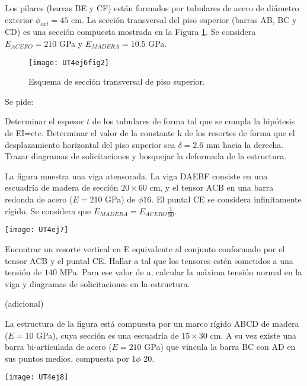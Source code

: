 Los pilares (barras BE y CF) están formados por tubulares de acero de diámetro exterior $\phi_{ext} = 45$ cm. %
%
La sección transversal del piso superior (barras AB, BC y CD) es una sección compuesta mostrada en la Figura \ref{fig62}. %
%
Se considera $E_{ACERO} = 210$ GPa y $E_{MADERA} = 10.5$ GPa.

\begin{figure}[htb]
	\centering
	\texttt{[image: UT4ej6fig2]}
	\caption{Esquema de sección transversal de piso superior.}
	\label{fig62}
\end{figure}
%

Se pide:

\parte Determinar el espesor $t$ de los tubulares de forma tal que se cumpla la hipótesis de EI=cte.
\parte Determinar el valor de la constante k de los resortes de forma que el desplazamiento horizontal del piso superior sea $\delta =2.6$ mm hacia la derecha.
\parte Trazar diagramas de solicitaciones y bosquejar la deformada de la estructura.



\ejercicio

La figura muestra una viga atensorada. La viga DAEBF consiste en una escuadría de madera de sección $20 \times 60$ cm, y el tensor ACB en una barra redonda de acero ($E=210$ GPa) de $\phi 16$. %
%
El puntal CE se considera infinitamente rígido. Se considera que $ E_{MADERA} = E_{ACERO} \frac{1}{30}$.

\begin{center}
	\texttt{[image: UT4ej7]}
\end{center}

\parte Encontrar un resorte vertical en E equivalente al conjunto conformado por el tensor ACB y el puntal CE.
\parte Hallar  a tal que  los tensores estén sometidos a una tensión de $140$ MPa.
\parte Para ese valor de a, calcular la máxima tensión normal en la viga y diagramas de solicitaciones en la estructura.



\ejercicio (adicional) 

La estructura de la figura está compuesta por un marco rígido ABCD de madera ($E=10$ GPa), cuya sección es una escuadría de $15 \times 30$ cm. A su vez existe una barra bi-articulada de acero ($E=210$ GPa) que vincula la barra BC con AD en sus puntos medios, compuesta por 1$\phi$ 20.

\begin{center}
	\texttt{[image: UT4ej8]}
\end{center}

